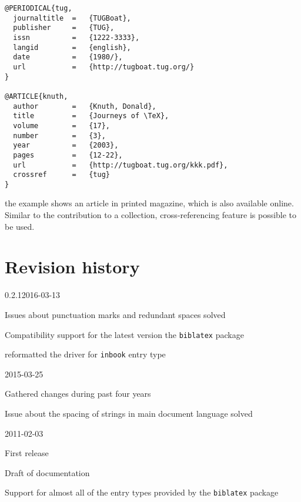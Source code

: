\documentclass[a4paper,10pt]{ltxdockit}
\def\t|#1|{\texttt{#1}}
\def\c#1{%
\hangpara{3em}{1}%
\fullcite{#1}}
\begin{document}
\c{knuth}
\begin{verbatim}
@PERIODICAL{tug,
  journaltitle  =   {TUGBoat},
  publisher     =   {TUG},
  issn          =   {1222-3333},
  langid        =   {english},
  date          =   {1980/},
  url           =   {http://tugboat.tug.org/}
}

@ARTICLE{knuth,
  author        =   {Knuth, Donald},
  title         =   {Journeys of \TeX},
  volume        =   {17},
  number        =   {3},
  year          =   {2003},
  pages         =   {12-22},
  url           =   {http://tugboat.tug.org/kkk.pdf},
  crossref      =   {tug}
}
\end{verbatim}

\noindent the example shows an article in printed magazine, which is also
available online. Similar to the contribution to a collection,
cross-referencing feature is possible to be used.

\nocite{*}
\printbibliography[title={Demonstrational bibliography},heading={bibnumbered}]


\section{Revision history}
\begin{changelog}
\begin{release}{0.2.1}{2016-03-13}
\item Issues about punctuation marks and redundant spaces solved
\item Compatibility support for the latest version the \t|biblatex| package
\item reformatted the driver for \verb|inbook| entry type
\end{release}
\begin{release}{0.2}{2015-03-25}
\item Gathered changes during past four years
\item Issue about the spacing of strings in main document language solved
\end{release}
\begin{release}{0.1}{2011-02-03}
\item First release
\item Draft of documentation
\item Support for almost all of the entry types provided by the \t|biblatex| package
\end{release}
\end{changelog}
\end{document}
